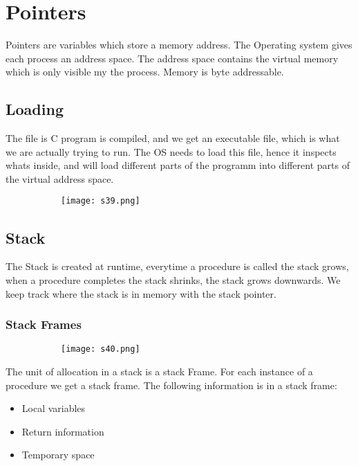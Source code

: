 \documentclass[8pt]{extreport}
\begin{document}
\chapter{ Pointers }

Pointers are variables which store a memory address. The Operating system gives each process an address space. The address space contains the virtual memory which is only visible my the process. Memory is byte addressable.

\section{ Loading }

The file is C program is compiled, and we get an executable file, which is what we are actually trying to run. The OS needs to load this file, hence it inspects whats inside, and will load different parts of the programm into different parts of the virtual address space.
 \begin{figure}[H]
\centering
\begin{subfigure}[b]{0.4\linewidth}
\texttt{[image: s39.png]}
\end{subfigure}
\end{figure}
\section{ Stack }
The Stack is created at runtime, everytime a procedure is called the stack grows, when a procedure completes the stack shrinks, the stack grows downwards. We keep track where the stack is in memory with the stack pointer.

\subsection{ Stack Frames }
 \begin{figure}[H]
\centering
\begin{subfigure}[b]{0.4\linewidth}
\texttt{[image: s40.png]}
\end{subfigure}
\end{figure}
The unit of allocation in a stack is a stack Frame. For each instance of a procedure we get a stack frame. The following information is in a stack frame:
\begin{itemize}
\item Local variables
\item Return information
\item Temporary space
\end{itemize}
\end{document}
